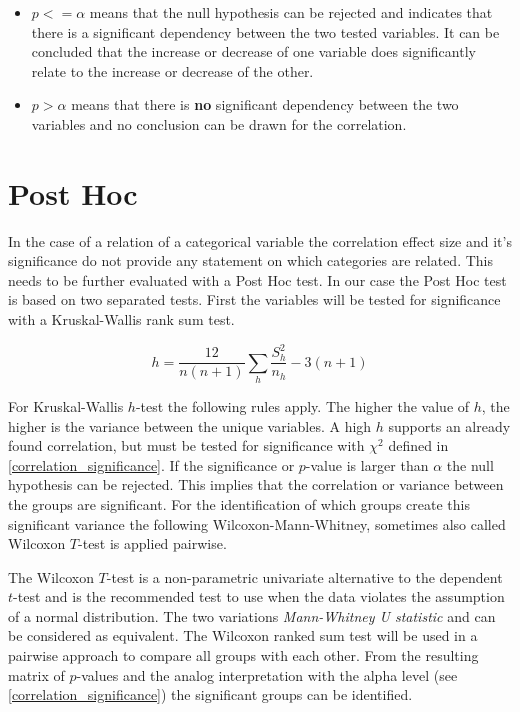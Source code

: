 \begin{itemize}
	\item $p <= \alpha$ means that the null hypothesis can be rejected and indicates that there is a significant dependency between the two tested variables. It can be concluded that the increase or decrease of one variable does significantly relate to the increase or decrease of the other.
	\item $p > \alpha$ means that there is \textbf{no} significant dependency between the two variables and no conclusion can be drawn for the correlation.
\end{itemize}

\section{Post Hoc}
\label{correlation_posthoc}
In the case of a relation of a categorical variable the correlation effect size and it's significance do not provide any statement on which categories are related. This needs to be further evaluated with a Post Hoc test. In our case the Post Hoc test is based on two separated tests. First the variables will be tested for significance with a Kruskal-Wallis rank sum test. 

\smallskip
\begin{equation}
\label{formula_kruskal_wallis}	
	h = \frac{12}{n(n+1)}\sum_{h}{\frac{S_h^2}{n_h}}-3(n+1)
\end{equation}

\medskip

For Kruskal-Wallis $h$-test the following rules apply. The higher the value of $h$, the higher is the variance between the unique variables. A high $h$ supports an already found correlation, but must be tested for significance with $\chi^2$ defined in \cref{correlation_significance}. If the significance or $p$-value is larger than $\alpha$ the null hypothesis can be rejected. This implies that the correlation or variance between the groups are significant. For the identification of which groups create this significant variance the following Wilcoxon-Mann-Whitney, sometimes also called Wilcoxon $T$-test is applied pairwise.

The Wilcoxon $T$-test is a non-parametric univariate alternative to the dependent $t$-test and is the recommended test to use when the data violates the assumption of a normal distribution. The two variations \textit{Mann-Whitney U statistic} and  can be considered as equivalent. The Wilcoxon ranked sum test will be used in a pairwise approach to compare all groups with each other. From the resulting matrix of $p$-values and the analog interpretation with the alpha level (see \cref{correlation_significance}) the significant groups can be identified.

